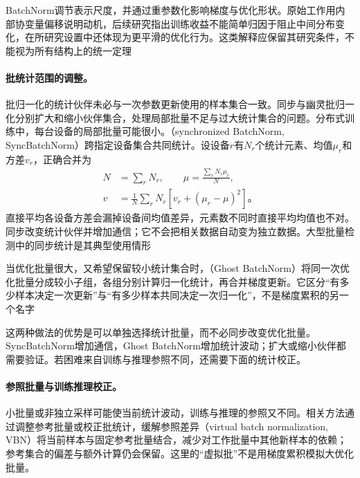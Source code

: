 BatchNorm调节表示尺度，并通过重参数化影响梯度与优化形状。原始工作用内部协变量偏移说明动机，后续研究指出训练收益不能简单归因于阻止中间分布变化，在所研究设置中还体现为更平滑的优化行为。这类解释应保留其研究条件，不能视为所有结构上的统一定理

\paragraph{批统计范围的调整。}

批归一化的统计伙伴未必与一次参数更新使用的样本集合一致。同步与幽灵批归一化分别扩大和缩小伙伴集合，处理局部批量不足与过大统计集合的问题。分布式训练中，每台设备的局部批量可能很小。（synchronized BatchNorm, SyncBatchNorm）跨指定设备集合共同统计。设设备$r$有$N_r$个统计元素、均值$\mu_r$和方差$v_r$，正确合并为
\begin{equation}
  \begin{aligned}
    N&=\sum_rN_r,\qquad \mu=\frac{\sum_rN_r\mu_r}{N},\\
    v&=\frac1N\sum_rN_r[v_r+(\mu_r-\mu)^2]\text{。}
  \end{aligned}
  \label{eq:training-sync-batchnorm}
\end{equation}
直接平均各设备方差会漏掉设备间均值差异，元素数不同时直接平均均值也不对。同步改变统计伙伴并增加通信；它不会把相关数据自动变为独立数据。大型批量检测中的同步统计是其典型使用情形

当优化批量很大，又希望保留较小统计集合时，（Ghost BatchNorm）将同一次优化批量分成较小子组，各组分别计算归一化统计，再合并梯度更新。它区分“有多少样本决定一次更新”与“有多少样本共同决定一次归一化”，不是梯度累积的另一个名字

这两种做法的优势是可以单独选择统计批量，而不必同步改变优化批量。SyncBatchNorm增加通信，Ghost BatchNorm增加统计波动；扩大或缩小伙伴都需要验证。若困难来自训练与推理参照不同，还需要下面的统计校正。

\paragraph{参照批量与训练推理校正。}

小批量或非独立采样可能使当前统计波动，训练与推理的参照又不同。相关方法通过调整参考批量或校正批统计，缓解参照差异（virtual batch normalization, VBN）将当前样本与固定参考批量结合，减少对工作批量中其他新样本的依赖；参考集合的偏差与额外计算仍会保留。这里的“虚拟批”不是用梯度累积模拟大优化批量。

